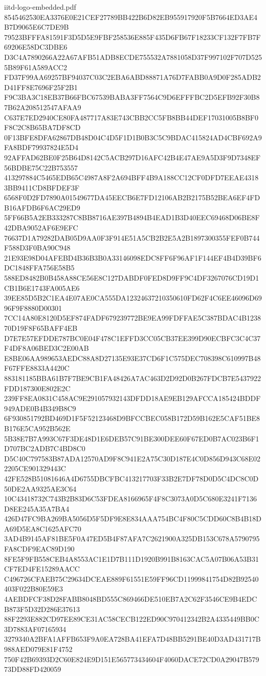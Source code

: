 \begin{filecontents*}[overwrite]{iitd-logo-embedded.pdf}
8545462530EA3376E0E21CEF27789BB422B6D82EB955917920F5B7664ED3AE4B7D9065E6C7DE9B
79523BFFFA81591F3D5D5E9FBF258536E885F435D6FB67F18233CF132F7FB7F69206E58DC3DBE6
D3C4A7890266A22A67AFB51ADB8ECDE755532A7881058D37F997102F707D5255B89F61A589ACC2
FD37F99AA69257BF94037C03C2EBA6ABD88871A76D7FABB0A9D0F285ADB2D41FF8E7696F25F2B1
F9C3BA3C18EB37B66FBC67539BABA3FF7564C9D6EFFFBC2D5EFB92F30B87B62A208512547AFAA9
C637E7ED2940CE80FA487717A83E743CBB2CC5FB8BB44DEF17031005B8BF0F8C2C8B65BA7DF8CD
0F13BFE8DFA62867DB48D04C4D5F1D1B0B3C5C9BDAC415824AD4CBF692A9FA8BDF79937824E5D4
92AFFAD62BE0F25B64D8142C5ACB297D16AFC42B4E47AE9A5D3F9D7348EF56BDBE75C22B753557
413297884C5465EDB65C4987A8F2A694BFF4B9A188CC12CF0DFD7EEAE43183BB9411CD8BFDEF3F
6568F0D2FD7890A01549677DA45EECB6E7FD12106AB2B2175B52BEA6EF4FDB16AFDB6F6AC29ED9
5FF66B5A2EB333287C8BB8716AE397B4894B4EAD1B3D40EEC69468D06BE8F42DBA9052AF6E9EFC
76637D1A79282DAB05D9AA0F3F914E51A5CB2B2E5A2B1897300355FEF0B744F588D3F0BA90C948
21E93E98D04AFEBD4B36B3B0A33146098EDC8FF6F96AF1F144EF4B4D39BF6DC1848FFA756E58B5
588ED8482B0B458A88CE56E8C127DABDF0FED8D9FF9C4DF3267076CD19D1CB1B6E1743FA005AE6
39EE85D5B2C1EA4E07AE0CA555DA12324637210350610FD62F4C6EE46096D6996F9F8880D00301
7CC14A80E8120D5EF874FADF679239772BE9EA99FDFFAE5C387BDAC4B123870D19F8F65BAFF4EB
D7E7E57EFDDE787BC0E04F478C1EFFD3CC05CB37EE399D90ECBFC3C4C37F4DF8A06BED3C2E00AB
E8BE06AA989653AEDC88A8D27135E93E37CD6F1C575DEC708398C610997B48F67FFE8833A4420C
883181185BBA61B7F7BE9CB1FA48426A7AC463D2D92D0B267FDCB7E5437922FDD187300E802E2C
239FF8EA0831C458AC9E291057932143DFDD18AE9EB129AFCCA185424BDDF949ADE0B4B349B8C9
6F930851792BD469D1F5F52123468D9BFCCBEC058B172D59B162E5CAF51BE8B176E5CA952B562E
5B38E7B7A993C67F3DE48D1E6DEB57C91BE300DEE60F67ED0B7AC023B6F1D707BC2ADB7C4BD8C0
D5C40C797583B87ADA12570AD9F8C941E2A75C30D187E4C0D856D943C68E022205CE901329443C
42FE528B51081646A4D6755DBCFBC413217703F33B2E7DF78D0D5C4DC8C0D50DE2AA9325AE3C64
10C43418732C743B2B83D6C53FDEA8166965F4F8C3073A0D5C680E3241F7136D8EE245A35A7BA4
426D47FC9BA269BA5056D5F5DF9E8E834AAA754BC4F80C5CDD60C8B4B18DA69D5EA8C1625AFC70
3AD4B9145AF81BE5F0A47ED5B4F87AFA7C2621900A325DB153C678A5790795FA8CDF9EAC89D190
8FE5F9FB558CEB4A8553AC1E1D7B111D1920B991B8163CAC5A07B06A53B31CF7ED4FE15289AACC
C496726CFAEB75C29634DCEAE889F61551E59FF96CD11999841754D82B92540403F022B80E59E3
4AEBDFCF38D28FABB8048BD555C869466DE510EB7A2C62F3546CE9B4EDCB873F5D32D286E37613
88F2293E882CD97EE89CE31AC58CECB122ED90C970412342B2A4335449BB0C3D7883AF07165934
3279340A2BFA1AFFB653F9A0EA728BA41EFA7D48BB5291BE40D3AD431717B988AED079E81F4752
750F42B69393D2C60E824E9D151E565773434604F4060DACE72CD0A29047B57973DD88FD420059

\end{filecontents*}
